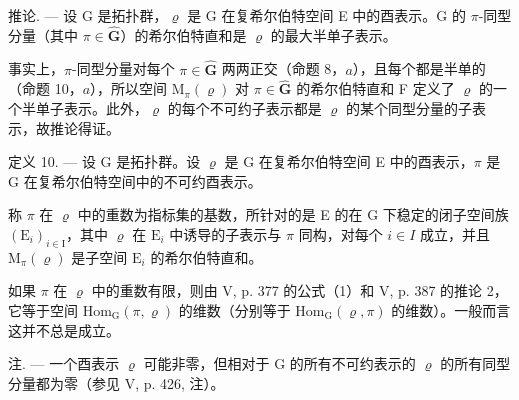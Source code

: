 推论. --- 设 G 是拓扑群，\(\varrho\) 是 G 在复希尔伯特空间 E 中的酉表示。G 的 \(\pi\)-同型分量（其中 \(\pi \in \widehat{\mathbf{G}}\)）的希尔伯特直和是 \(\varrho\) 的最大半单子表示。

事实上，\(\pi\)-同型分量对每个 \(\pi \in \widehat{\mathbf{G}}\) 两两正交（命题 8，\(a\)），且每个都是半单的（命题 10，\(a\)），所以空间 \(\mathrm{M}_{\pi}(\varrho)\) 对 \(\pi \in \widehat{\mathbf{G}}\) 的希尔伯特直和 F 定义了 \(\varrho\) 的一个半单子表示。此外，\(\varrho\) 的每个不可约子表示都是 \(\varrho\) 的某个同型分量的子表示，故推论得证。

定义 10. --- 设 G 是拓扑群。设 \(\varrho\) 是 G 在复希尔伯特空间 E 中的酉表示，\(\pi\) 是 G 在复希尔伯特空间中的不可约酉表示。

称 \(\pi\) 在 \(\varrho\) 中的重数为指标集的基数，所针对的是 E 的在 G 下稳定的闭子空间族 \((\mathrm{E}_i)_{i\in \mathrm{I}}\)，其中 \(\varrho\) 在 \(\mathrm{E}_i\) 中诱导的子表示与 \(\pi\) 同构，对每个 \(i\in I\) 成立，并且 \(\mathrm{M}_{\pi}(\varrho)\) 是子空间 \(\mathrm{E}_i\) 的希尔伯特直和。

如果 \(\pi\) 在 \(\varrho\) 中的重数有限，则由 V, p. 377 的公式（1）和 V, p. 387 的推论 2，它等于空间 \(\mathrm{Hom}_{\mathrm{G}}(\pi, \varrho)\) 的维数（分别等于 \(\mathrm{Hom}_{\mathrm{G}}(\varrho, \pi)\) 的维数）。一般而言这并不总是成立。

注. --- 一个酉表示 \(\varrho\) 可能非零，但相对于 G 的所有不可约表示的 \(\varrho\) 的所有同型分量都为零（参见 V, p. 426, 注）。

